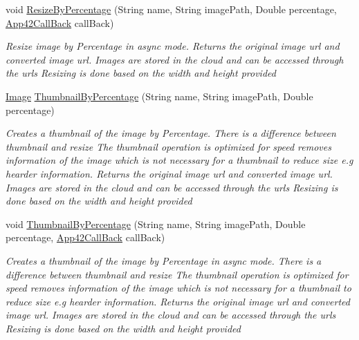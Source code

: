 \begin{DoxyCompactItemize}
void \hyperlink{classcom_1_1shephertz_1_1app42_1_1paas_1_1sdk_1_1csharp_1_1image_processor_1_1_image_processor_service_a3f0991cfdb2f6e696d2ddffbe540617d}{Resize\+By\+Percentage} (String name, String image\+Path, Double percentage, \hyperlink{interfacecom_1_1shephertz_1_1app42_1_1paas_1_1sdk_1_1csharp_1_1_app42_call_back}{App42\+Call\+Back} call\+Back)
\begin{DoxyCompactList}\small\item\em Resize image by Percentage in async mode. Returns the original image url and converted image url. Images are stored in the cloud and can be accessed through the urls Resizing is done based on the width and height provided \end{DoxyCompactList}\item 
\hyperlink{classcom_1_1shephertz_1_1app42_1_1paas_1_1sdk_1_1csharp_1_1image_processor_1_1_image}{Image} \hyperlink{classcom_1_1shephertz_1_1app42_1_1paas_1_1sdk_1_1csharp_1_1image_processor_1_1_image_processor_service_a5f3291009301e49dbdb086245cf06030}{Thumbnail\+By\+Percentage} (String name, String image\+Path, Double percentage)
\begin{DoxyCompactList}\small\item\em Creates a thumbnail of the image by Percentage. There is a difference between thumbnail and resize The thumbnail operation is optimized for speed removes information of the image which is not necessary for a thumbnail to reduce size e.\+g hearder information. Returns the original image url and converted image url. Images are stored in the cloud and can be accessed through the urls Resizing is done based on the width and height provided \end{DoxyCompactList}\item 
void \hyperlink{classcom_1_1shephertz_1_1app42_1_1paas_1_1sdk_1_1csharp_1_1image_processor_1_1_image_processor_service_a2b209bd5fdd0e702baf83a19c1924fc7}{Thumbnail\+By\+Percentage} (String name, String image\+Path, Double percentage, \hyperlink{interfacecom_1_1shephertz_1_1app42_1_1paas_1_1sdk_1_1csharp_1_1_app42_call_back}{App42\+Call\+Back} call\+Back)
\begin{DoxyCompactList}\small\item\em Creates a thumbnail of the image by Percentage in async mode. There is a difference between thumbnail and resize The thumbnail operation is optimized for speed removes information of the image which is not necessary for a thumbnail to reduce size e.\+g hearder information. Returns the original image url and converted image url. Images are stored in the cloud and can be accessed through the urls Resizing is done based on the width and height provided \end{DoxyCompactList}\item 

\end{DoxyCompactItemize}
